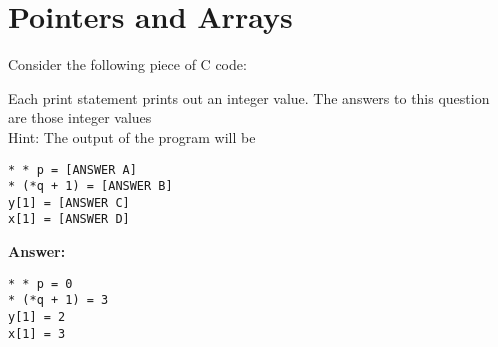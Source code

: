 \newpage
\section{Pointers and Arrays} 

Consider the following piece of C code:

\resetlinenumber[1]
\linenumbers
\begin{tt}
  
\end{tt}
\nolinenumbers

Each print statement prints out an integer value. The answers to this question are those integer values
~\\

Hint: The output of the program will be

\begin{verbatim}
* * p = [ANSWER A]
* (*q + 1) = [ANSWER B]
y[1] = [ANSWER C]
x[1] = [ANSWER D]
\end{verbatim}

\ifexam


\else


{\bf Answer:}
\begin{verbatim}
* * p = 0
* (*q + 1) = 3
y[1] = 2
x[1] = 3
\end{verbatim}
\fi
